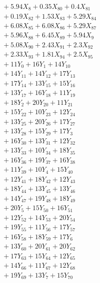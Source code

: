 \documentclass[a4paper,10pt]{article}
\begin{document}
{\begin{align}
&\quad  + 5.94X_{8} + 0.35X_{80} + 0.4X_{81} \\[0.5ex]
&\quad  + 0.19X_{82} + 1.53X_{83} + 5.29X_{84} \\[0.5ex]
&\quad  + 6.08X_{85} + 6.08X_{86} + 5.29X_{87} \\[0.5ex]
&\quad  + 5.96X_{88} + 6.45X_{89} + 5.94X_{9} \\[0.5ex]
&\quad  + 5.08X_{90} + 2.43X_{91} + 2.3X_{92} \\[0.5ex]
&\quad  + 2.33X_{93} + 1.81X_{94} + 2.5X_{95} \\[0.5ex]
&\quad  + 11Y_{0} + 16Y_{1} + 14Y_{10} \\[0.5ex]
&\quad  + 14Y_{11} + 14Y_{12} + 17Y_{13} \\[0.5ex]
&\quad  + 17Y_{14} + 13Y_{15} + 15Y_{16} \\[0.5ex]
&\quad  + 13Y_{17} + 16Y_{18} + 11Y_{19} \\[0.5ex]
&\quad  + 18Y_{2} + 20Y_{20} + 11Y_{21} \\[0.5ex]
&\quad  + 15Y_{22} + 10Y_{23} + 12Y_{24} \\[0.5ex]
&\quad  + 13Y_{25} + 20Y_{26} + 17Y_{27} \\[0.5ex]
&\quad  + 13Y_{28} + 15Y_{29} + 17Y_{3} \\[0.5ex]
&\quad  + 16Y_{30} + 13Y_{31} + 12Y_{32} \\[0.5ex]
&\quad  + 13Y_{33} + 10Y_{34} + 18Y_{35} \\[0.5ex]
&\quad  + 16Y_{36} + 19Y_{37} + 16Y_{38} \\[0.5ex]
&\quad  + 11Y_{39} + 10Y_{4} + 15Y_{40} \\[0.5ex]
&\quad  + 12Y_{41} + 18Y_{42} + 12Y_{43} \\[0.5ex]
&\quad  + 18Y_{44} + 13Y_{45} + 13Y_{46} \\[0.5ex]
&\quad  + 14Y_{47} + 19Y_{48} + 18Y_{49} \\[0.5ex]
&\quad  + 20Y_{5} + 15Y_{50} + 16Y_{51} \\[0.5ex]
&\quad  + 12Y_{52} + 14Y_{53} + 20Y_{54} \\[0.5ex]
&\quad  + 19Y_{55} + 11Y_{56} + 17Y_{57} \\[0.5ex]
&\quad  + 16Y_{58} + 18Y_{59} + 17Y_{6} \\[0.5ex]
&\quad  + 13Y_{60} + 20Y_{61} + 20Y_{62} \\[0.5ex]
&\quad  + 17Y_{63} + 15Y_{64} + 12Y_{65} \\[0.5ex]
&\quad  + 14Y_{66} + 11Y_{67} + 12Y_{68} \\[0.5ex]
&\quad  + 19Y_{69} + 13Y_{7} + 15Y_{70} \\[0.5ex]

\end{align}}
\end{document}
